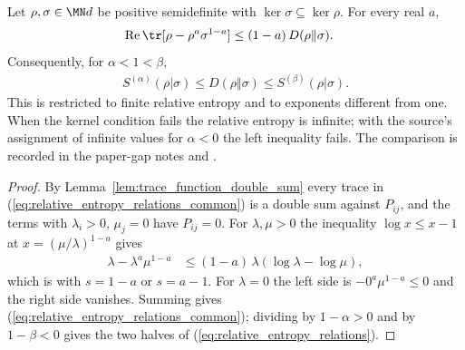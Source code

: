 \begin{theorem}
    \label{thm:relative_entropy_relations}
    \leanok
    Let $\rho,\sigma\in\MN d$ be positive semidefinite with
    $\ker\sigma\subseteq\ker\rho$. For every real $a$,
    \begin{align}
        \operatorname{Re}\tr[\rho-\rho^a\sigma^{1-a}]
            &\le(1-a)\,D(\rho\Vert\sigma).
        \label{eq:relative_entropy_relations_common}
    \end{align}
    Consequently, for $\alpha<1<\beta$,
    \begin{align}
        S^{(\alpha)}(\rho|\sigma)\le D(\rho\Vert\sigma)\le S^{(\beta)}(\rho|\sigma).
        \label{eq:relative_entropy_relations}
    \end{align}
    This is \cite[Equation~(8.38)]{Wolf2012Quantum} restricted to finite
    relative entropy and to exponents different from one. When the kernel
    condition fails the relative entropy is infinite; with the source's
    assignment of infinite values for $\alpha<0$ the left inequality fails.
    The comparison is recorded in the paper-gap notes
     and
    .
\end{theorem}
\begin{proof}
    \leanok
    By Lemma~\ref{lem:trace_function_double_sum} every trace in
    (\ref{eq:relative_entropy_relations_common}) is a double sum against
    $P_{ij}$, and the terms with $\lambda_i>0$, $\mu_j=0$ have $P_{ij}=0$.
    For $\lambda,\mu>0$ the inequality $\log x\le x-1$ at
    $x=(\mu/\lambda)^{1-a}$ gives
    \begin{align}
        \lambda-\lambda^a\mu^{1-a}
            &\le(1-a)\,\lambda(\log\lambda-\log\mu),
        \label{eq:relative_entropy_relations_scalar}
    \end{align}
    which is \cite[Equation~(8.39)]{Wolf2012Quantum} with $s=1-a$ or
    $s=a-1$. For $\lambda=0$ the left side is $-0^a\mu^{1-a}\le0$ and the
    right side vanishes. Summing gives
    (\ref{eq:relative_entropy_relations_common}); dividing by $1-\alpha>0$ and by
    $1-\beta<0$ gives the two halves of (\ref{eq:relative_entropy_relations}).
\end{proof}

